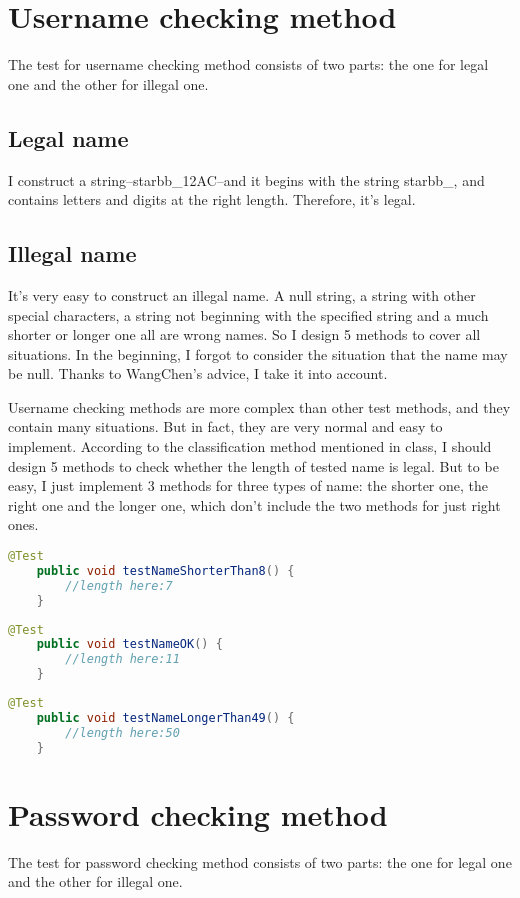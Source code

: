 \documentclass[a4paper]{report}
\begin{document}
\section{Username checking method}
\par The test for username checking method consists of two parts: the one for legal one and the other for illegal one.
\subsection{Legal name}
\par I construct a string--starbb\_12AC--and it begins with the string starbb\_, and contains letters and digits at the right length. Therefore, it's legal.
\subsection{Illegal name}
\par It's very easy to construct an illegal name. A null string, a string with other special characters, a string not beginning with the specified string and a much shorter or longer one all are wrong names. So I design 5 methods to cover all situations. In the beginning, I forgot to consider the situation that the name may be null. Thanks to WangChen's advice, I take it into account.
\par Username checking methods are more complex than other test methods, and they contain many situations. But in fact, they are very normal and easy to implement. According to the classification method mentioned in class, I should design 5 methods to check whether the length of tested name is legal. But to be easy, I just implement 3 methods for three types of name: the shorter one, the right one and the longer one, which don't include the two methods for just right ones.
\begin{lstlisting}[language=java]
    @Test
    public void testNameShorterThan8() {
        //length here:7
    }
\end{lstlisting}
\begin{lstlisting}[language=java]
    @Test
    public void testNameOK() {
        //length here:11
    }
\end{lstlisting}
\begin{lstlisting}[language=java]
    @Test
    public void testNameLongerThan49() {
        //length here:50
    }
\end{lstlisting}
\section{Password checking method}
\par The test for password checking method consists of two parts: the one for legal one and the other for illegal one.
\end{document}
